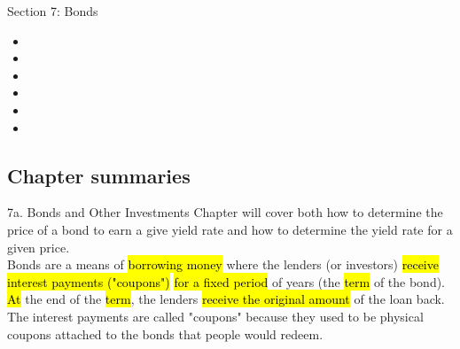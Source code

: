 \begin{ASM_chapter}
Section 7: Bonds
\begin{itemize}[leftmargin = *]
	\item	{}
	\item	{}
	\item	{}
	\item	{}
	\item	{}
	\item	{}
\end{itemize}
\end{ASM_chapter}

\subsection{Chapter summaries}

\begin{CHPT_SUMM_AUTO}[label = {L.-7a}]{7a. Bonds and Other Investments}
Chapter will cover both how to determine the price of a bond to earn a give yield rate and how to determine the yield rate for a given price.\\

Bonds are a means of \hl{borrowing money} where the lenders (or investors) \hl{receive interest payments ("coupons")} \hl{for a fixed period} of years (the \hl{term} of the bond). \hl{At} the end of the \hl{term}, the lenders \hl{receive the original amount} of the loan back.\\

The interest payments are called "coupons" because they used to be physical coupons attached to the bonds that people would redeem.
\end{CHPT_SUMM_AUTO}

